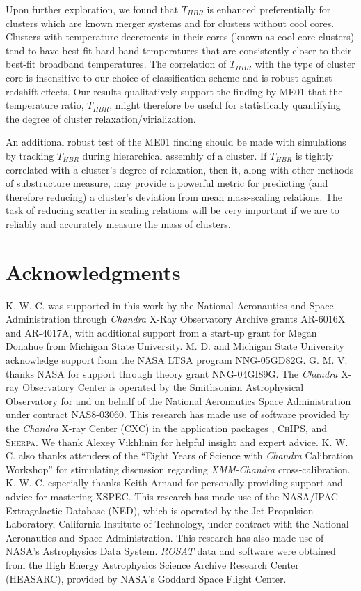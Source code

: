 Upon further exploration, we found that $T_{HBR}$ is enhanced
preferentially for clusters which are known merger systems and for
clusters without cool cores. Clusters with temperature decrements in
their cores (known as cool-core clusters) tend to have best-fit
hard-band temperatures that are consistently closer to their best-fit
broadband temperatures. The correlation of $T_{HBR}$ with the type of
cluster core is insensitive to our choice of classification scheme and
is robust against redshift effects. Our results qualitatively support
the finding by ME01 that the temperature ratio, $T_{HBR}$, might
therefore be useful for statistically quantifying the degree of
cluster relaxation/virialization.

An additional robust test of the ME01 finding should be made with
simulations by tracking $T_{HBR}$ during hierarchical assembly of a
cluster. If $T_{HBR}$ is tightly correlated with a cluster's degree of
relaxation, then it, along with other methods of substructure measure,
may provide a powerful metric for predicting (and therefore reducing)
a cluster's deviation from mean mass-scaling relations. The task of
reducing scatter in scaling relations will be very important if we are
to reliably and accurately measure the mass of clusters.

\section{Acknowledgments}

K. W. C. was supported in this work by the National Aeronautics and
Space Administration through {\it Chandra} X-Ray Observatory Archive
grants AR-6016X and AR-4017A, with additional support from a start-up
grant for Megan Donahue from Michigan State University. M. D.  and
Michigan State University acknowledge support from the NASA LTSA
program NNG-05GD82G. G. M. V. thanks NASA for support through theory
grant NNG-04GI89G. The {\it Chandra} X-ray Observatory Center is
operated by the Smithsonian Astrophysical Observatory for and on
behalf of the National Aeronautics Space Administration under contract
NAS8-03060. This research has made use of software provided by the
{\it Chandra} X-ray Center (CXC) in the application packages \ciao,
{\textsc{ChIPS}}, and {\textsc{Sherpa}}. We thank Alexey Vikhlinin for
helpful insight and expert advice. K. W. C. also thanks attendees of
the ``Eight Years of Science with {\it Chandra} Calibration Workshop''
for stimulating discussion regarding {\it XMM}-{\it Chandra}
cross-calibration. K. W. C. especially thanks Keith Arnaud for
personally providing support and advice for mastering
{\textsc{XSPEC}}. This research has made use of the NASA/IPAC
Extragalactic Database (NED), which is operated by the Jet Propulsion
Laboratory, California Institute of Technology, under contract with
the National Aeronautics and Space Administration. This research has
also made use of NASA's Astrophysics Data System. {\it ROSAT} data and
software were obtained from the High Energy Astrophysics Science
Archive Research Center (HEASARC), provided by NASA's Goddard Space
Flight Center.
